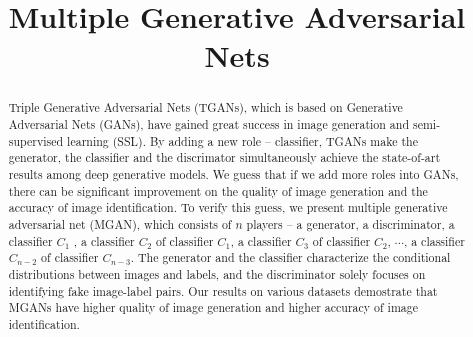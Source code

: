 \documentclass[conference]{IEEEtran}
\begin{document}
\title{Multiple Generative Adversarial Nets}

\author{
}


\maketitle

\begin{abstract}
Triple Generative Adversarial Nets (TGANs), which is based on Generative Adversarial Nets (GANs), have gained great success in image generation and semi-supervised learning (SSL). By adding a new role -- classifier, TGANs make the generator, the classifier and the discrimator simultaneously achieve the state-of-art results among deep generative models. \color{red} We guess that if we add more roles into GANs, there can be significant improvement on the quality of image generation and the accuracy of image identification. \color{black} To verify this guess, we present multiple generative adversarial net (MGAN), which consists of $n$ players -- a generator, a discriminator, a classifier $C_1$ , a classifier $C_2$ of classifier $C_1$, a classifier $C_3$ of classifier $C_2$, $\cdots$, a classifier $C_{n-2}$ of classifier $C_{n-3}$. The generator and the classifier characterize the conditional distributions between images and labels, and the discriminator solely focuses on identifying fake image-label pairs. Our results on various datasets demostrate that MGANs have higher quality of image generation and higher accuracy of image identification. 
\end{abstract}
\end{document}
